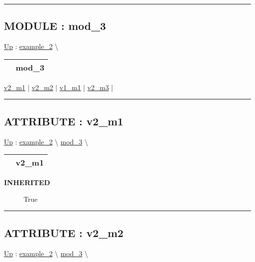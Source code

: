 \rule{\linewidth}{0.5pt}


\subsection*{MODULE : mod\_3}
\hypertarget{ecldoc:example_2.mod_3}{}
\hyperlink{ecldoc:example_2}{Up} :
\hspace{0pt} \hyperlink{ecldoc:example_2}{example_2} \textbackslash 

{\renewcommand{\arraystretch}{1.5}
\begin{tabularx}{\textwidth}{|>{\raggedright\arraybackslash}l|X|}
\hline
\hspace{0pt} & mod\_3 \\
\hline
\end{tabularx}
}

\par


\hyperlink{ecldoc:example_2.mod_1.v2_m1}{v2\_m1}  |
\hyperlink{ecldoc:example_2.mod_2.v2_m2}{v2\_m2}  |
\hyperlink{ecldoc:example_2.mod_3.v1_m1}{v1\_m1}  |
\hyperlink{ecldoc:example_2.mod_3.v2_m3}{v2\_m3}  |

\rule{\linewidth}{0.5pt}

\subsection*{ATTRIBUTE : v2\_m1}
\hypertarget{ecldoc:example_2.mod_1.v2_m1}{}
\hyperlink{ecldoc:example_2.mod_3}{Up} :
\hspace{0pt} \hyperlink{ecldoc:example_2}{example_2} \textbackslash 
\hspace{0pt} \hyperlink{ecldoc:example_2.mod_3}{mod_3} \textbackslash 

{\renewcommand{\arraystretch}{1.5}
\begin{tabularx}{\textwidth}{|>{\raggedright\arraybackslash}l|X|}
\hline
\hspace{0pt} & v2\_m1 \\
\hline
\end{tabularx}
}

\par

\par
\begin{description}
\item [\textbf{INHERITED}] True
\end{description}

\rule{\linewidth}{0.5pt}
\subsection*{ATTRIBUTE : v2\_m2}
\hypertarget{ecldoc:example_2.mod_2.v2_m2}{}
\hyperlink{ecldoc:example_2.mod_3}{Up} :
\hspace{0pt} \hyperlink{ecldoc:example_2}{example_2} \textbackslash 
\hspace{0pt} \hyperlink{ecldoc:example_2.mod_3}{mod_3} \textbackslash 

